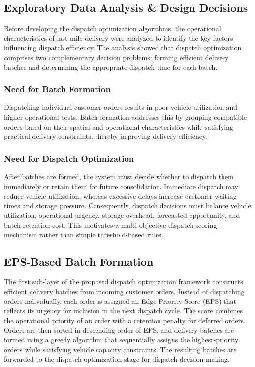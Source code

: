 \documentclass{article}
\begin{document}
\subsection{Exploratory Data Analysis \& Design Decisions}
\label{subsec:operational_analysis_design}

Before developing the dispatch optimization algorithms, the operational characteristics of last-mile delivery were analyzed to identify the key factors influencing dispatch efficiency. The analysis showed that dispatch optimization comprises two complementary decision problems: forming efficient delivery batches and determining the appropriate dispatch time for each batch.

\subsubsection{Need for Batch Formation}
\label{subsubsec:need_batch_formation}

Dispatching individual customer orders results in poor vehicle utilization and higher operational costs. Batch formation addresses this by grouping compatible orders based on their spatial and operational characteristics while satisfying practical delivery constraints, thereby improving delivery efficiency.

\subsubsection{Need for Dispatch Optimization}
\label{subsubsec:need_dispatch_optimization}

After batches are formed, the system must decide whether to dispatch them immediately or retain them for future consolidation. Immediate dispatch may reduce vehicle utilization, whereas excessive delays increase customer waiting times and storage pressure. Consequently, dispatch decisions must balance vehicle utilization, operational urgency, storage overhead, forecasted opportunity, and batch retention cost. This motivates a multi-objective dispatch scoring mechanism rather than simple threshold-based rules.

\subsection{EPS-Based Batch Formation}
\label{subsec:eps_batch_formation}

The first sub-layer of the proposed dispatch optimization framework constructs efficient delivery batches from incoming customer orders. Instead of dispatching orders individually, each order is assigned an Edge Priority Score (EPS) that reflects its urgency for inclusion in the next dispatch cycle. The score combines the operational priority of an order with a retention penalty for deferred orders. Orders are then sorted in descending order of EPS, and delivery batches are formed using a greedy algorithm that sequentially assigns the highest-priority orders while satisfying vehicle capacity constraints. The resulting batches are forwarded to the dispatch optimization stage for dispatch decision-making.
\end{document}
